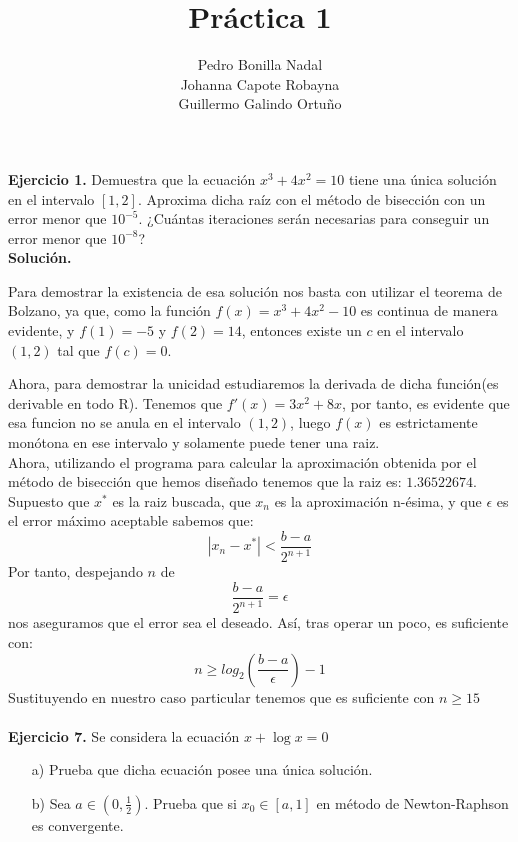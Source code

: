 \documentclass[11pt]{article}
\title{\textbf{Práctica 1}}
\author{Pedro Bonilla Nadal\\
		Johanna Capote Robayna\\
		Guillermo Galindo Ortuño}
\date{}
\begin{document}
\maketitle

\textbf{Ejercicio 1.}
Demuestra que la ecuaci\'on $x^3 + 4x^2 = 10 $ tiene una \'unica soluci\'on en el intervalo $ [1,2] $. Aproxima dicha ra\'iz con el m\'etodo de bisecci\'on con un error menor que $10^{-5}$. ¿Cu\'antas iteraciones ser\'an necesarias para conseguir un error menor que $10^{-8}$?
\\

\textbf{Solución.}

Para demostrar la existencia de esa solución nos basta con utilizar el teorema de Bolzano, ya que, como la funci\'on $f(x)=x^3 +4x^2 -10$ es continua de manera evidente, y $f(1) = -5$ y $f(2) =  14$, entonces existe un $c$ en el intervalo $(1,2)$ tal que $f(c) = 0$.

Ahora, para demostrar la unicidad estudiaremos la derivada de dicha función(es derivable en todo
 R). Tenemos que $f'(x) = 3x^2 +8x$, por tanto, es evidente que esa funcion no se anula en el intervalo $(1,2)$, luego $f(x)$ es estrictamente monótona en ese intervalo y solamente puede tener una raiz.
\\

Ahora, utilizando el programa para calcular la aproximación obtenida por el método de bisección que hemos diseñado tenemos que la raiz es: $1.36522674$.
\\

Supuesto que $x^*$ es la raiz buscada, que $x_n$ es la aproximación n-ésima, y que $\epsilon$ es el error máximo aceptable sabemos que:
$$|x_n - x^*| < \frac{b-a}{2^{n+1}}$$
Por tanto, despejando $n$ de
$$\frac{b-a}{2^{n+1}} = \epsilon$$
nos aseguramos que el error sea el deseado. Así, tras operar un poco, es suficiente con:
$$ n \geq log_2(\frac{b-a}{\epsilon})-1$$
Sustituyendo en nuestro caso particular tenemos que es suficiente con $n \geq 15$
\\ \\


\textbf{Ejercicio 7.}
Se considera la ecuaci\'on $x + \log x = 0$

\begin{itemize}
\item[a)]Prueba que dicha ecuaci\'on posee una \'unica soluci\'on.
\item[b)] Sea $a \in (0, \frac{1}{2})$. Prueba que  si $x_0 \in [a,1]$ en m\'etodo de Newton-Raphson es convergente.
\end{itemize}
\end{document}
